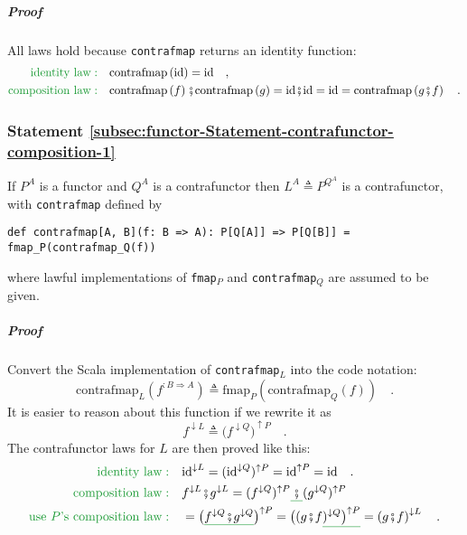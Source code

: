 \subparagraph{Proof}

All laws hold because \lstinline!contrafmap! returns an identity
function:
\begin{align*}
{\color{greenunder}\text{identity law}:}\quad & \text{contrafmap}\left(\text{id}\right)=\text{id}\quad,\\
{\color{greenunder}\text{composition law}:}\quad & \text{contrafmap}\left(f\right)\bef\text{contrafmap}\left(g\right)=\text{id}\bef\text{id}=\text{id}=\text{contrafmap}\left(g\bef f\right)\quad.
\end{align*}


\subsubsection{Statement \label{subsec:functor-Statement-contrafunctor-composition-1}\ref{subsec:functor-Statement-contrafunctor-composition-1}}

If $P^{A}$ is a functor and $Q^{A}$ is a contrafunctor then $L^{A}\triangleq P^{Q^{A}}$
is a contrafunctor, with \lstinline!contrafmap! defined by
\begin{lstlisting}
def contrafmap[A, B](f: B => A): P[Q[A]] => P[Q[B]] = fmap_P(contrafmap_Q(f))
\end{lstlisting}
where lawful implementations of \lstinline!fmap!$_{P}$ and \lstinline!contrafmap!$_{Q}$
are assumed to be given.

\subparagraph{Proof}

Convert the Scala implementation of \lstinline!contrafmap!$_{L}$
into the code notation:
\[
\text{contrafmap}_{L}(f^{:B\Rightarrow A})\triangleq\text{fmap}_{P}(\text{contrafmap}_{Q}(f))\quad.
\]
It is easier to reason about this function if we rewrite it as
\[
f^{\downarrow L}\triangleq\big(f^{\downarrow Q}\big)^{\uparrow P}\quad.
\]
The contrafunctor laws for $L$ are then proved like this:
\begin{align*}
{\color{greenunder}\text{identity law}:}\quad & \text{id}^{\downarrow L}=(\text{id}^{\downarrow Q})^{\uparrow P}=\text{id}^{\uparrow P}=\text{id}\quad.\\
{\color{greenunder}\text{composition law}:}\quad & f^{\downarrow L}\bef g^{\downarrow L}=(f^{\downarrow Q})^{\uparrow P}\gunderline{\,\bef\,}(g^{\downarrow Q})^{\uparrow P}\\
{\color{greenunder}\text{use }P\text{'s composition law}:}\quad & =\big(\gunderline{f^{\downarrow Q}\bef g^{\downarrow Q}}\big)^{\uparrow P}=\big((g\bef f\gunderline{)^{\downarrow Q}\big)^{\uparrow P}}=\left(g\bef f\right)^{\downarrow L}\quad.
\end{align*}

